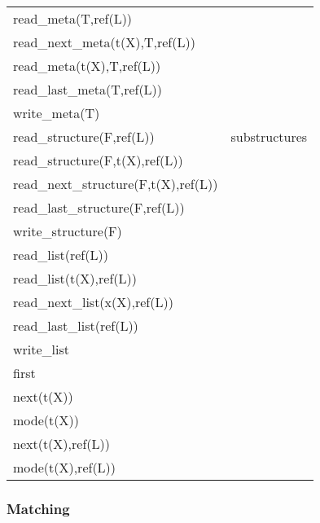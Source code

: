 \begin{tabular}{|l|l|}
\hline
read_meta(T,ref(L))             &         \\
read_next_meta(t(X),T,ref(L))   &                 \\
read_meta(t(X),T,ref(L))        &                 \\
read_last_meta(T,ref(L))        &                 \\
write_meta(T)                   &  \\
\hline
read_structure(F,ref(L))        & substructures                   \\
read_structure(F,t(X),ref(L))   &                         \\
read_next_structure(F,t(X),ref(L)) &                      \\
read_last_structure(F,ref(L))   &                         \\
write_structure(F)              &                 \\
read_list(ref(L))               &                 \\
read_list(t(X),ref(L))          &                 \\
read_next_list(x(X),ref(L))     &                         \\
read_last_list(ref(L))          &                 \\
write_list                      &         \\
\hline
first                           &  \\
next(t(X))                      &         \\
mode(t(X))                      &         \\
next(t(X),ref(L))               &                 \\
mode(t(X),ref(L))               &                 \\
\hline
\end{tabular}

\subsubsection{Matching}

